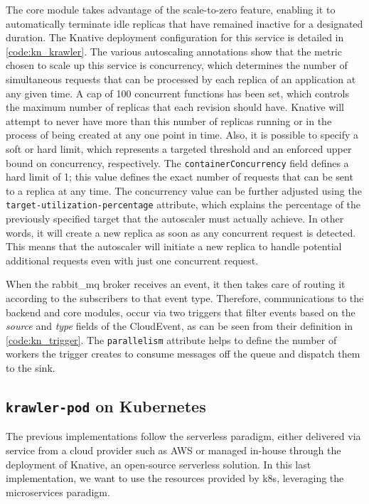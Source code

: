 \documentclass[../thesis.tex]{subfiles}
\begin{document}
The core module takes advantage of the scale-to-zero feature, enabling it to automatically terminate idle replicas that have remained inactive for a designated duration. The Knative deployment configuration for this service is detailed in \autoref{code:kn_krawler}. The various autoscaling annotations show that the metric chosen to scale up this service is concurrency, which determines the number of simultaneous requests that can be processed by each replica of an application at any given time. A cap of 100 concurrent functions has been set, which controls the maximum number of replicas that each revision should have. Knative will attempt to never have more than this number of replicas running or in the process of being created at any one point in time. Also, it is possible to specify a soft or hard limit, which represents a targeted threshold and an enforced upper bound on concurrency, respectively. The \texttt{containerConcurrency} field defines a hard limit of 1; this value defines the exact number of requests that can be sent to a replica at any time. The concurrency value can be further adjusted using the \texttt{target-utilization-percentage} attribute, which explains the percentage of the previously specified target that the autoscaler must actually achieve. In other words, it will create a new replica as soon as any concurrent request is detected. This means that the autoscaler will initiate a new replica to handle potential additional requests even with just one concurrent request.

When the \gls{rabbit_mq} broker receives an event, it then takes care of routing it according to the subscribers to that event type. Therefore, communications to the backend and core modules, occur via two triggers that filter events based on the \textit{source} and \textit{type} fields of the CloudEvent, as can be seen from their definition in \autoref{code:kn_trigger}. The \texttt{parallelism} attribute helps to define the number of workers the trigger creates to consume messages off the queue and dispatch them to the sink.

\subsection{\texttt{krawler-pod} on Kubernetes}\label{subsec:krawler-pod}
The previous implementations follow the serverless paradigm, either delivered via service from a cloud provider such as \acrshort{AWS} or managed in-house through the deployment of Knative, an open-source serverless solution. In this last implementation, we want to use the resources provided by \gls{k8s}, leveraging the microservices paradigm.
\end{document}
